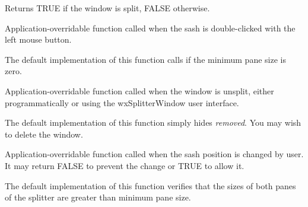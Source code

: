 Returns TRUE if the window is split, FALSE otherwise.

\label{wxsplitterwindowondoubleclicksash}


Application-overridable function called when the sash is double-clicked with
the left mouse button.





The default implementation of this function calls  if
the minimum pane size is zero.



\label{wxsplitterwindowonunsplit}


Application-overridable function called when the window is unsplit, either
programmatically or using the wxSplitterWindow user interface.




The default implementation of this function simply hides {\it removed}. You
may wish to delete the window.

\label{wxsplitterwindowonsashpositionchange}


Application-overridable function called when the sash position is changed by 
user. It may return FALSE to prevent the change or TRUE to allow it.




The default implementation of this function verifies that the sizes of both 
panes of the splitter are greater than minimum pane size.

